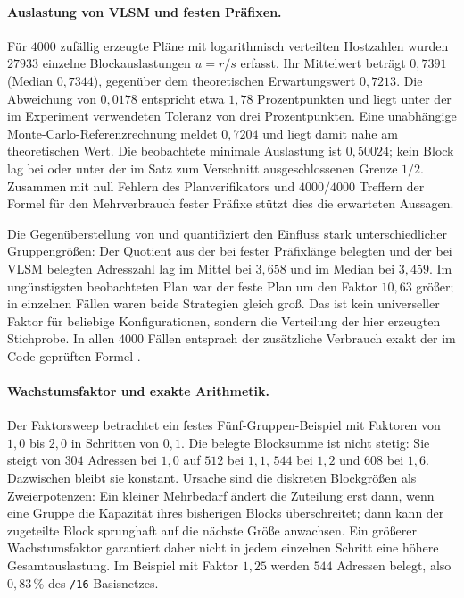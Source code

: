 \documentclass[a4paper,12pt, twoside]{report}
\theoremstyle{definition}
\newcommand{\code}[1]{\texttt{\detokenize{#1}}}
\begin{document}
\paragraph{Auslastung von VLSM und festen Präfixen.}
Für $4000$ zufällig erzeugte Pläne mit logarithmisch verteilten Hostzahlen wurden $27933$ einzelne Blockauslastungen $u=r/s$ erfasst. Ihr Mittelwert beträgt $0{,}7391$ (Median $0{,}7344$), gegenüber dem theoretischen Erwartungswert $0{,}7213$. Die Abweichung von $0{,}0178$ entspricht etwa $1{,}78$ Prozentpunkten und liegt unter der im Experiment verwendeten Toleranz von drei Prozentpunkten. Eine unabhängige Monte-Carlo-Referenzrechnung meldet $0{,}7204$ und liegt damit nahe am theoretischen Wert. Die beobachtete minimale Auslastung ist $0{,}50024$; kein Block lag bei oder unter der im Satz zum Verschnitt ausgeschlossenen Grenze $1/2$. Zusammen mit null Fehlern des Planverifikators und $4000/4000$ Treffern der Formel für den Mehrverbrauch fester Präfixe stützt dies die erwarteten Aussagen.

Die Gegenüberstellung von \code{vlsm} und \code{fixed} quantifiziert den Einfluss stark unterschiedlicher Gruppengrößen: Der Quotient aus der bei fester Präfixlänge belegten und der bei VLSM belegten Adresszahl lag im Mittel bei $3{,}658$ und im Median bei $3{,}459$. Im ungünstigsten beobachteten Plan war der feste Plan um den Faktor $10{,}63$ größer; in einzelnen Fällen waren beide Strategien gleich groß. Das ist kein universeller Faktor für beliebige Konfigurationen, sondern die Verteilung der hier erzeugten Stichprobe. In allen $4000$ Fällen entsprach der zusätzliche Verbrauch exakt der im Code geprüften Formel \code{fixed\_extra\_waste}.

\paragraph{Wachstumsfaktor und exakte Arithmetik.}
Der Faktorsweep betrachtet ein festes Fünf-Gruppen-Beispiel mit Faktoren von $1{,}0$ bis $2{,}0$ in Schritten von $0{,}1$. Die belegte Blocksumme ist nicht stetig: Sie steigt von $304$ Adressen bei $1{,}0$ auf $512$ bei $1{,}1$, $544$ bei $1{,}2$ und $608$ bei $1{,}6$. Dazwischen bleibt sie konstant. Ursache sind die diskreten Blockgrößen als Zweierpotenzen: Ein kleiner Mehrbedarf ändert die Zuteilung erst dann, wenn eine Gruppe die Kapazität ihres bisherigen Blocks überschreitet; dann kann der zugeteilte Block sprunghaft auf die nächste Größe anwachsen. Ein größerer Wachstumsfaktor garantiert daher nicht in jedem einzelnen Schritt eine höhere Gesamtauslastung. Im Beispiel mit Faktor $1{,}25$ werden $544$ Adressen belegt, also $0{,}83\,\%$ des \texttt{/16}-Basisnetzes.
\end{document}
